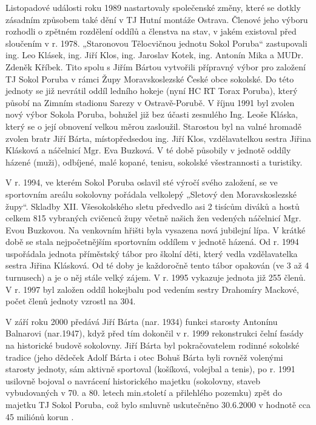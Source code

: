 \documentclass[openany]{report}
\begin{document}
Listopadové události roku 1989 nastartovaly společenské změny, které se dotkly zásadním způsobem také dění v TJ Hutní montáže Ostrava. Členové jeho výboru rozhodli o zpětném rozdělení oddílů a členstva na stav, v jakém existoval před sloučením v r. 1978.  „Staronovou Tělocvičnou jednotu Sokol Poruba“ zastupovali ing. Leo Klásek, ing. Jiří Klos, ing. Jaroslav Kotek, ing. Antonín Mika a MUDr. Zdeněk Kříbek. Tito spolu s Jiřím Bártou vytvořili přípravný výbor pro založení TJ Sokol Poruba v rámci Župy Moravskoslezské České obce sokolské. Do této jednoty se již nevrátil oddíl ledního hokeje (nyní HC RT Torax Poruba), který působí na Zimním stadionu Sarezy v Ostravě-Porubě. V říjnu 1991 byl zvolen nový výbor Sokola Poruba, bohužel již bez účasti zesnulého Ing. Leoše Kláska, který se o její obnovení velkou měrou zasloužil. Starostou byl na valné hromadě zvolen bratr Jiří Bárta, místopředsedou ing. Jiří Klos, vzdělavatelkou sestra Jiřina Klásková a náčelnicí Mgr. Eva Buzková. V té době působily v jednotě oddíly házené (muži), odbíjené, malé kopané, tenisu, sokolské všestrannosti a turistiky.

V r. 1994, ve kterém Sokol Poruba oslavil sté výročí svého založení, se ve sportovním areálu sokolovny pořádala velkolepý „Sletový den Moravskoslezské župy“. Skladby XII. Všesokolského sletu předvedlo asi 2 tisícům diváků a hostů celkem 815 vybraných cvičenců župy včetně  našich žen vedených náčelnicí Mgr. Evou Buzkovou. Na venkovním hřišti byla vysazena nová jubilejní lípa. V krátké době se stala nejpočetnějším sportovním oddílem v jednotě házená. Od r. 1994 uspořádala jednota příměstský tábor pro školní děti, který vedla vzdělavatelka sestra Jiřina Klásková. Od té doby je každoročně tento tábor opakován (ve 3 až 4 turnusech) a je o něj  stále velký zájem. V r. 1995 vykazuje jednota již 255 členů. V r. 1997 byl založen oddíl hokejbalu pod vedením sestry Drahomíry Mackové, počet členů jednoty vzrostl na 304.

V září roku 2000 předává Jiří Bárta (nar. 1934) funkci starosty Antonínu Balnarovi (nar.1947), když před tím dokončil v r. 1999 rekonstrukci čelní fasády na historické budově sokolovny. Jiří Bárta byl pokračovatelem rodinné sokolské tradice (jeho dědeček Adolf Bárta i otec Bohuš Bárta byli  rovněž volenými starosty jednoty, sám aktivně sportoval (košíková, volejbal a tenis), po r. 1991 usilovně bojoval o navrácení historického majetku (sokolovny, staveb vybudovaných v 70. a 80. letech min.století a přilehlého pozemku) zpět do majetku TJ Sokol Poruba, což bylo smluvně uskutečněno 30.6.2000 v hodnotě cca 45 miliónů korun .
\end{document}

